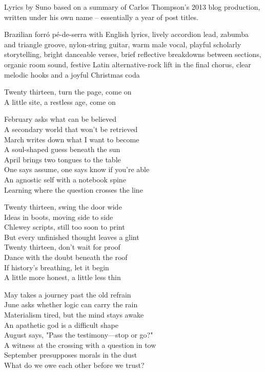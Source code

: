 
\begin{notes}
Lyrics by Suno based on a summary of Carlos Thompson's 2013 blog production, written under his own name -- essentially a year of post titles.
\end{notes}
\begin{style}
Brazilian forró pé-de-serra with English lyrics, lively accordion lead, zabumba and triangle groove, nylon-string guitar, warm male vocal, playful scholarly storytelling, bright danceable verses, brief reflective breakdowns between sections, organic room sound, festive Latin alternative-rock lift in the final chorus, clear melodic hooks and a joyful Christmas coda
\end{style}
\begin{lyrics}
Twenty thirteen, turn the page, come on\\
A little site, a restless age, come on

February asks what can be believed\\
A secondary world that won't be retrieved\\
March writes down what I want to become\\
A soul-shaped guess beneath the sun\\
April brings two tongues to the table\\
One says assume, one says know if you're able\\
An agnostic self with a notebook spine\\
Learning where the question crosses the line

Twenty thirteen, swing the door wide\\
Ideas in boots, moving side to side\\
Chlewey scripts, still too soon to print\\
But every unfinished thought leaves a glint\\
Twenty thirteen, don't wait for proof\\
Dance with the doubt beneath the roof\\
If history's breathing, let it begin\\
A little more honest, a little less thin

May takes a journey past the old refrain\\
June asks whether logic can carry the rain\\
Materialism tired, but the mind stays awake\\
An apathetic god is a difficult shape\\
August says, "Pass the testimony—stop or go?"\\
A witness at the crossing with a question in tow\\
September presupposes morals in the dust\\
What do we owe each other before we trust?


\end{lyrics}
